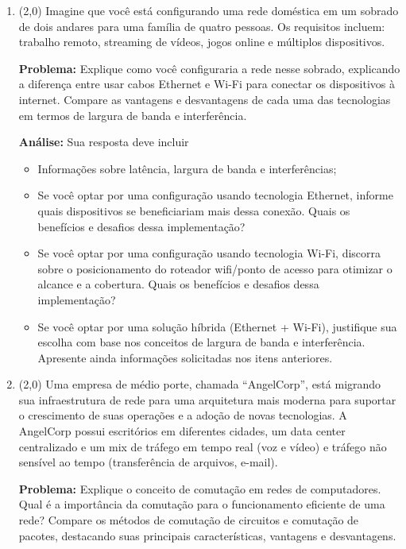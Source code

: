 \documentclass[a4paper,11pt]{modelo/prova}
\begin{document}
\maketitle

\begin{enumerate}
   \item (2,0) Imagine que você está configurando uma rede doméstica em um sobrado de dois andares para uma família de quatro pessoas. Os requisitos incluem: trabalho remoto, streaming de vídeos, jogos online e múltiplos dispositivos.

   \textbf{Problema:} Explique como você configuraria a rede nesse sobrado, explicando a diferença entre usar cabos Ethernet e Wi-Fi para conectar os dispositivos à internet. Compare as vantagens e desvantagens de cada uma das tecnologias em termos de largura de banda e interferência.
   
   \textbf{Análise:} Sua resposta deve incluir
   \begin{itemize}
      \item Informações sobre latência, largura de banda e interferências;
      \item Se você optar por uma configuração usando tecnologia Ethernet, informe quais dispositivos se beneficiariam mais dessa conexão. Quais os benefícios e desafios dessa implementação?
      \item Se você optar por uma configuração usando tecnologia Wi-Fi, discorra sobre o posicionamento do roteador wifi/ponto de acesso para otimizar o alcance e a cobertura. Quais os benefícios e desafios dessa implementação?
      \item Se você optar por uma solução híbrida (Ethernet + Wi-Fi), justifique sua escolha com base nos conceitos de largura de banda e interferência. Apresente ainda informações solicitadas nos itens anteriores.
   \end{itemize}

   \item (2,0) Uma empresa de médio porte, chamada ``AngelCorp'', está migrando sua infraestrutura de rede para uma arquitetura mais moderna para suportar o crescimento de suas operações e a adoção de novas tecnologias. A AngelCorp possui escritórios em diferentes cidades, um data center centralizado e um mix de tráfego em tempo real (voz e vídeo) e tráfego não sensível ao tempo (transferência de arquivos, e-mail).

   \textbf{Problema:} Explique o conceito de comutação em redes de computadores. Qual é a importância da comutação para o funcionamento eficiente de uma rede? Compare os métodos de comutação de circuitos e comutação de pacotes, destacando suas principais características, vantagens e desvantagens.


\end{enumerate}
\end{document}
